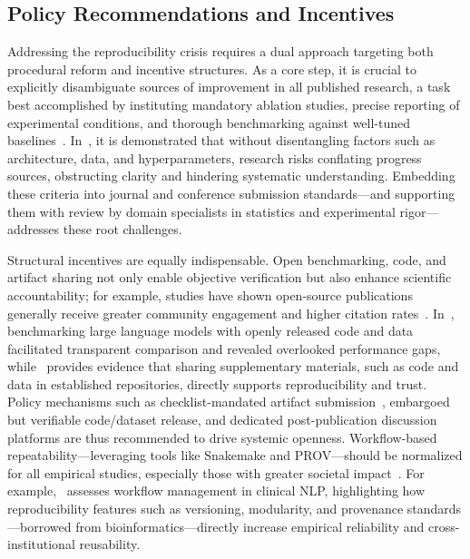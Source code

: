 \documentclass[sigconf]{acmart}
\begin{document}
\subsection{Policy Recommendations and Incentives}

Addressing the reproducibility crisis requires a dual approach targeting both procedural reform and incentive structures. As a core step, it is crucial to explicitly disambiguate sources of improvement in all published research, a task best accomplished by instituting mandatory ablation studies, precise reporting of experimental conditions, and thorough benchmarking against well-tuned baselines~\cite{ref107,ref108}. In~\cite{ref107}, it is demonstrated that without disentangling factors such as architecture, data, and hyperparameters, research risks conflating progress sources, obstructing clarity and hindering systematic understanding. Embedding these criteria into journal and conference submission standards---and supporting them with review by domain specialists in statistics and experimental rigor---addresses these root challenges.

Structural incentives are equally indispensable. Open benchmarking, code, and artifact sharing not only enable objective verification but also enhance scientific accountability; for example, studies have shown open-source publications generally receive greater community engagement and higher citation rates~\cite{ref94,ref95,ref106,ref108}. In~\cite{ref94}, benchmarking large language models with openly released code and data facilitated transparent comparison and revealed overlooked performance gaps, while~\cite{ref108} provides evidence that sharing supplementary materials, such as code and data in established repositories, directly supports reproducibility and trust. Policy mechanisms such as checklist-mandated artifact submission~\cite{ref33}, embargoed but verifiable code/dataset release, and dedicated post-publication discussion platforms are thus recommended to drive systemic openness. Workflow-based repeatability---leveraging tools like Snakemake and PROV---should be normalized for all empirical studies, especially those with greater societal impact~\cite{ref12,ref13,ref24,ref25,ref28,ref29,ref32,ref33,ref34,ref39,ref44,ref46,ref50,ref58,ref65,ref66,ref67,ref71,ref81,ref82,ref87,ref92,ref93,ref94,ref95,ref101,ref102,ref104,ref105,ref106,ref107,ref108}. For example,~\cite{ref28} assesses workflow management in clinical NLP, highlighting how reproducibility features such as versioning, modularity, and provenance standards—borrowed from bioinformatics—directly increase empirical reliability and cross-institutional reusability.
\end{document}
